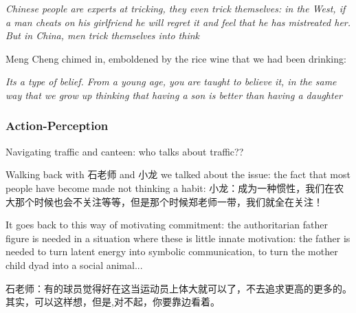 \textit{Chinese people are experts at tricking, they even trick themselves: in the West, if a man cheats on his girlfriend he will regret it and feel that he has mistreated her.  But in China, men trick themselves into think}

Meng Cheng chimed in, emboldened by the rice wine that we had been drinking:

\textit{Its a type of belief. From a young age, you are taught to believe it, in the same way that we grow up thinking that having a son is better than having a daughter}











    \subsubsection{Action-Perception}

Navigating traffic and canteen: who talks about traffic??






            Walking back with 石老师 and 小龙 we talked about the issue:  the fact that most people have become made not thinking a habit:
                  小龙：成为一种惯性，我们在农大那个时候也会不关注等等，但是那个时候郑老师一带，我们就全在关注！

                        It goes back to this way of motivating commitment: the authoritarian father figure is needed in a situation where these is little innate motivation: the father is needed to turn latent energy into symbolic communication, to turn the mother child dyad into a social animal...

                        石老师：有的球员觉得好在这当运动员上体大就可以了，不去追求更高的更多的。其实，可以这样想，但是,对不起，你要靠边看着。





